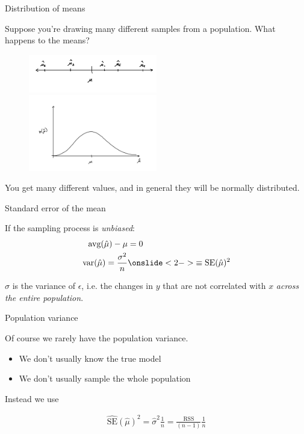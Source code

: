 \documentclass[aspectratio=169]{beamer}
\begin{document}
\begin{frame}{Distribution of means}

Suppose you're drawing many different samples from a population.  What happens to the means?
\pause
\begin{figure}
\includegraphics[width=0.5\textwidth]{pop-sample-mean}
\includegraphics[width=0.5\textwidth]{distribution}
\end{figure}

You get many different values, and in general they will be normally distributed.

\end{frame}

\begin{frame}{Standard error of the mean}

If the sampling process is \textit{unbiased}:
\begin{align*}
\text{avg}(\hat{\mu}) - \mu &= 0\\
\text{var}(\hat{\mu}) = \frac{\sigma^2}{n} &\onslide<2->{\equiv \text{SE}(\hat{\mu})^2}
\end{align*}

\pause
$\sigma$ is the variance of $\epsilon$, i.e. the changes in $y$ that are not correlated with $x$ \textit{across the entire population}.

\vspace{5mm}

\end{frame}

\begin{frame}{Population variance}

Of course we rarely have the population variance.  
\begin{itemize}
\item We don't usually know the true model
\item We don't usually sample the whole population
\end{itemize}

\vspace{5mm}

Instead we use

\begin{align*}
\hat{\text{SE}}(\hat{\mu})^2 = \hat{\sigma}^2\frac{1}{n} = \frac{\text{RSS}}{(n-1)}\frac{1}{n}
\end{align*}
\end{frame}
\end{document}
